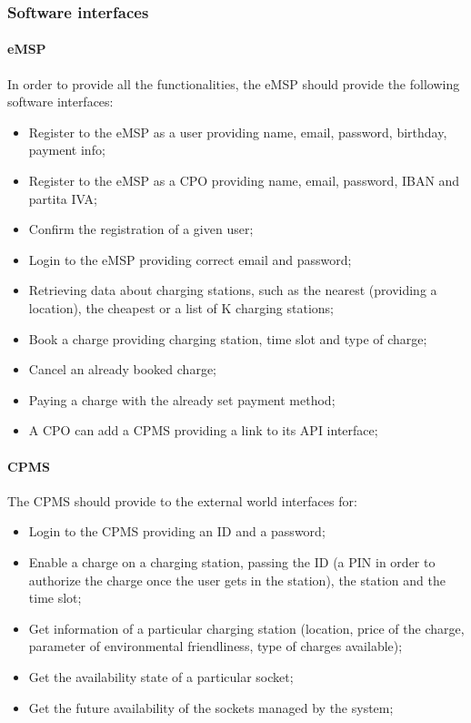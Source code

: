\subsubsection{Software interfaces}
\paragraph{\ac{eMSP}}
In order to provide all the functionalities, the \ac{eMSP} should provide the following software interfaces:
\begin{itemize}
    \item Register to the \ac{eMSP} as a user providing name, email, password, birthday, payment info;
    \item Register to the \ac{eMSP} as a \ac{CPO} providing name, email, password, \ac{IBAN} and \gls{partita IVA};
    \item Confirm the registration of a given user;
    \item Login to the \ac{eMSP} providing correct email and password;
    \item Retrieving data about charging stations, such as the nearest (providing a location), the cheapest or a list of K charging stations;
    \item Book a charge providing charging station, time slot and type of charge;
    \item Cancel an already booked charge;
    \item Paying a charge with the already set payment method;
    \item A \ac{CPO} can add a \ac{CPMS} providing a link to its \ac{API} interface;
\end{itemize}

\paragraph{\ac{CPMS}}
The \ac{CPMS} should provide to the external world interfaces for:
\begin{itemize}
    \item Login to the \ac{CPMS} providing an ID and a password;
    \item Enable a charge on a charging station, passing the ID (a PIN in order to authorize the charge once the user gets in the station), the station and the time slot;
    \item Get information of a particular charging station (location, price of the charge, parameter of environmental friendliness, type of charges available);
    \item Get the availability state of a particular socket;
    \item Get the future availability of the sockets managed by the system;
\end{itemize}

